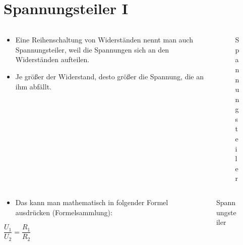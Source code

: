 
\section{Spannungsteiler I}
\label{section:spannungsteiler_1}
\begin{frame}%

\begin{columns}
    \begin{column}{0.48\textwidth}
    \begin{itemize}
  \item Eine Reihenschaltung von Widerständen nennt man auch Spannungsteiler, weil die Spannungen sich an den Widerständen aufteilen.
  \item Je größer der Widerstand, desto größer die Spannung, die an ihm abfällt.
  \end{itemize}

    \end{column}
   \begin{column}{0.48\textwidth}
       
\begin{figure}
    \caption{\scriptsize Spannungsteiler}
    \label{e_spannungsteiler}
\end{figure}


   \end{column}
\end{columns}

\end{frame}

\begin{frame}
\begin{columns}
    \begin{column}{0.48\textwidth}
    \begin{itemize}
  \item Das kann man mathematisch in folgender Formel ausdrücken (Formelsammlung):
  \end{itemize}
$\dfrac{ U_{ 1 } }{ U_{ 2 } } = \dfrac{ R_{ 1 } }{ R_{ 2 } }$


    \end{column}
   \begin{column}{0.48\textwidth}
       
\begin{figure}
    \caption{\scriptsize Spannungsteiler}
    \label{e_spannungsteiler}
\end{figure}


   \end{column}
\end{columns}

\end{frame}

